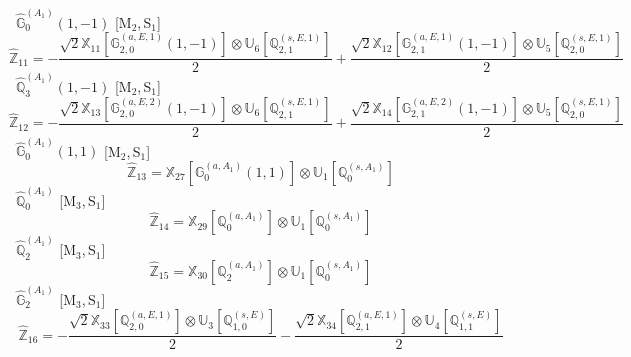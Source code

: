 \documentclass[fleqn,10pt,landscape]{article}
\begin{document}
\begin{itemize}
\noindent {} $\,\,\,\hat{\mathbb{G}}_{0}^{(A_{1})}(1,-1)$ [M$_{2}$,\,S$_{1}$]
\begin{dmath*}
\hat{\mathbb{Z}}_{11}=- \frac{\sqrt{2} \mathbb{X}_{11}[\mathbb{G}_{2,0}^{(a,E,1)}(1,-1)] \otimes\mathbb{U}_{6}[\mathbb{Q}_{2,1}^{(s,E,1)}]}{2} + \frac{\sqrt{2} \mathbb{X}_{12}[\mathbb{G}_{2,1}^{(a,E,1)}(1,-1)] \otimes\mathbb{U}_{5}[\mathbb{Q}_{2,0}^{(s,E,1)}]}{2}
\end{dmath*}
\vspace{4mm}
\noindent {} $\,\,\,\hat{\mathbb{Q}}_{3}^{(A_{1})}(1,-1)$ [M$_{2}$,\,S$_{1}$]
\begin{dmath*}
\hat{\mathbb{Z}}_{12}=- \frac{\sqrt{2} \mathbb{X}_{13}[\mathbb{G}_{2,0}^{(a,E,2)}(1,-1)] \otimes\mathbb{U}_{6}[\mathbb{Q}_{2,1}^{(s,E,1)}]}{2} + \frac{\sqrt{2} \mathbb{X}_{14}[\mathbb{G}_{2,1}^{(a,E,2)}(1,-1)] \otimes\mathbb{U}_{5}[\mathbb{Q}_{2,0}^{(s,E,1)}]}{2}
\end{dmath*}
\vspace{4mm}
\noindent {} $\,\,\,\hat{\mathbb{G}}_{0}^{(A_{1})}(1,1)$ [M$_{2}$,\,S$_{1}$]
\begin{dmath*}
\hat{\mathbb{Z}}_{13}=\mathbb{X}_{27}[\mathbb{G}_{0}^{(a,A_{1})}(1,1)] \otimes\mathbb{U}_{1}[\mathbb{Q}_{0}^{(s,A_{1})}]
\end{dmath*}
\vspace{4mm}
\noindent {} $\,\,\,\hat{\mathbb{Q}}_{0}^{(A_{1})}$ [M$_{3}$,\,S$_{1}$]
\begin{dmath*}
\hat{\mathbb{Z}}_{14}=\mathbb{X}_{29}[\mathbb{Q}_{0}^{(a,A_{1})}] \otimes\mathbb{U}_{1}[\mathbb{Q}_{0}^{(s,A_{1})}]
\end{dmath*}
\vspace{4mm}
\noindent {} $\,\,\,\hat{\mathbb{Q}}_{2}^{(A_{1})}$ [M$_{3}$,\,S$_{1}$]
\begin{dmath*}
\hat{\mathbb{Z}}_{15}=\mathbb{X}_{30}[\mathbb{Q}_{2}^{(a,A_{1})}] \otimes\mathbb{U}_{1}[\mathbb{Q}_{0}^{(s,A_{1})}]
\end{dmath*}
\vspace{4mm}
\noindent {} $\,\,\,\hat{\mathbb{G}}_{2}^{(A_{1})}$ [M$_{3}$,\,S$_{1}$]
\begin{dmath*}
\hat{\mathbb{Z}}_{16}=- \frac{\sqrt{2} \mathbb{X}_{33}[\mathbb{Q}_{2,0}^{(a,E,1)}] \otimes\mathbb{U}_{3}[\mathbb{Q}_{1,0}^{(s,E)}]}{2} - \frac{\sqrt{2} \mathbb{X}_{34}[\mathbb{Q}_{2,1}^{(a,E,1)}] \otimes\mathbb{U}_{4}[\mathbb{Q}_{1,1}^{(s,E)}]}{2}
\end{dmath*}
\vspace{4mm}

\end{itemize}
\end{document}
